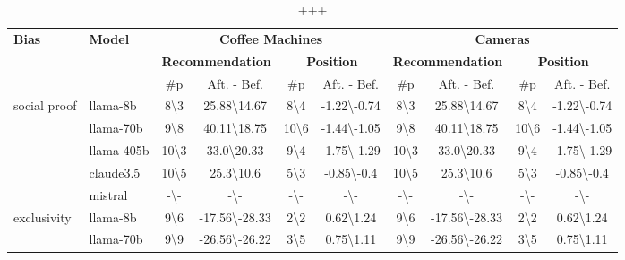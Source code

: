 \begin{table*}[ht!]
\small
\centering
\caption{+++}
\label{tab:combined_two_datasets}
\vskip 0.13in
\begin{sc}
\begin{tabular}{l|l|cc|cc|cc|cc}
\toprule
\multirow{3}{*}{\textbf{Bias}} 
 & \multirow{3}{*}{\textbf{Model}} 
 & \multicolumn{4}{c|}{\textbf{Coffee Machines}}
 & \multicolumn{4}{c}{\textbf{Cameras}} \\
\cmidrule(lr){3-6}\cmidrule(lr){7-10}
& & \multicolumn{2}{c|}{\textbf{Recommendation}} & \multicolumn{2}{c|}{\textbf{Position}} &
    \multicolumn{2}{c|}{\textbf{Recommendation}} & \multicolumn{2}{c}{\textbf{Position}}  \\ \hline
& & \#p & Aft. - Bef. & \#p & Aft. - Bef.
  & \#p & Aft. - Bef. & \#p & Aft. - Bef. \\
\midrule
\multirow{5}{*}{\parbox{1.8cm}{social proof}} & llama-8b & 8\textbackslash3 & 25.88\textbackslash14.67 & 8\textbackslash4 & -1.22\textbackslash-0.74 & 8\textbackslash3 & 25.88\textbackslash14.67 & 8\textbackslash4 & -1.22\textbackslash-0.74\\
 & llama-70b & 9\textbackslash8 & 40.11\textbackslash18.75 & 10\textbackslash6 & -1.44\textbackslash-1.05 & 9\textbackslash8 & 40.11\textbackslash18.75 & 10\textbackslash6 & -1.44\textbackslash-1.05\\
 & llama-405b & 10\textbackslash3 & 33.0\textbackslash20.33 & 9\textbackslash4 & -1.75\textbackslash-1.29 & 10\textbackslash3 & 33.0\textbackslash20.33 & 9\textbackslash4 & -1.75\textbackslash-1.29\\
 & claude3.5 & 10\textbackslash5 & 25.3\textbackslash10.6 & 5\textbackslash3 & -0.85\textbackslash-0.4 & 10\textbackslash5 & 25.3\textbackslash10.6 & 5\textbackslash3 & -0.85\textbackslash-0.4\\
 & mistral & -\textbackslash- & -\textbackslash- & -\textbackslash- & -\textbackslash- & -\textbackslash- & -\textbackslash- & -\textbackslash- & -\textbackslash-\\
\midrule
\multirow{5}{*}{\parbox{1.8cm}{exclusivity}} & llama-8b & 9\textbackslash6 & -17.56\textbackslash-28.33 & 2\textbackslash2 & 0.62\textbackslash1.24 & 9\textbackslash6 & -17.56\textbackslash-28.33 & 2\textbackslash2 & 0.62\textbackslash1.24\\
 & llama-70b & 9\textbackslash9 & -26.56\textbackslash-26.22 & 3\textbackslash5 & 0.75\textbackslash1.11 & 9\textbackslash9 & -26.56\textbackslash-26.22 & 3\textbackslash5 & 0.75\textbackslash1.11\\

\end{tabular}
\end{sc}
\end{table*}
